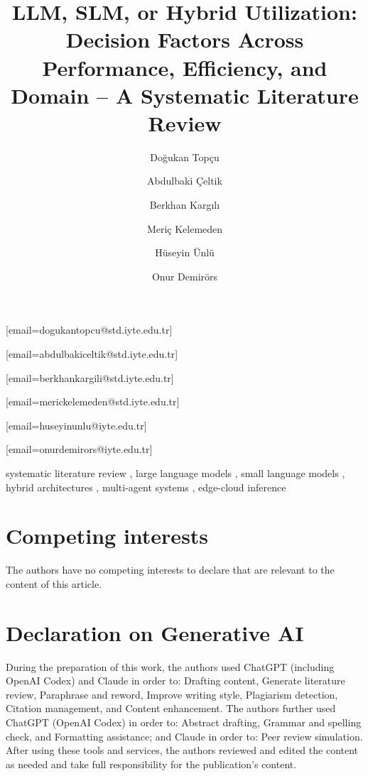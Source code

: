 \documentclass{ceurart}
\begin{document}


\title{LLM, SLM, or Hybrid Utilization: Decision Factors Across Performance,
  Efficiency, and Domain -- A Systematic Literature Review}

\author[1]{Doğukan Topçu}[email=dogukantopcu@std.iyte.edu.tr]
\author[1]{Abdulbaki Çeltik}[email=abdulbakiceltik@std.iyte.edu.tr]
\author[1]{Berkhan Kargılı}[email=berkhankargili@std.iyte.edu.tr]
\author[1]{Meriç Kelemeden}[email=merickelemeden@std.iyte.edu.tr]
\author[1]{Hüseyin Ünlü}[email=huseyinunlu@iyte.edu.tr]
\author[1]{Onur Demirörs}[email=onurdemirors@iyte.edu.tr]

\address[1]{Izmir Institute of Technology, Urla, Izmir, Türkiye}



\begin{keywords}
systematic literature review \sep
large language models \sep
small language models \sep
hybrid architectures \sep
multi-agent systems \sep
edge-cloud inference
\end{keywords}

\maketitle








\appendix


\section*{Competing interests}
The authors have no competing interests to declare that are relevant to the
content of this article.

\section*{Declaration on Generative AI}
During the preparation of this work, the authors used ChatGPT (including
OpenAI Codex) and Claude in order to: Drafting content, Generate literature
review, Paraphrase and reword, Improve writing style, Plagiarism detection,
Citation management, and Content enhancement. The authors further used ChatGPT
(OpenAI Codex) in order to: Abstract drafting, Grammar and spelling check, and
Formatting assistance; and Claude in order to: Peer review simulation. After
using these tools and services, the authors reviewed and edited the content as
needed and take full responsibility for the publication's content.


\end{document}

